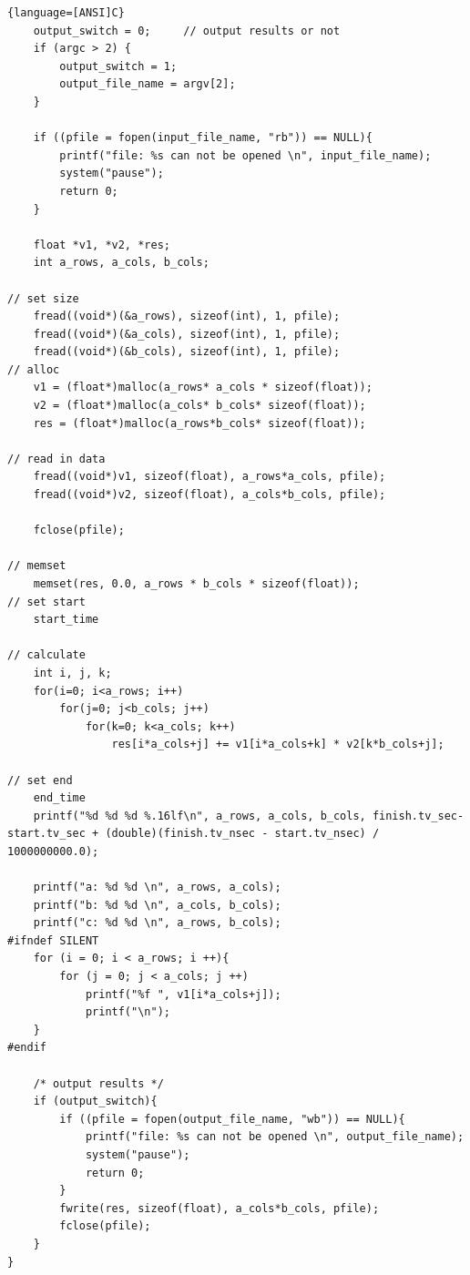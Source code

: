 \documentclass[a4paper]{article}   %
\begin{document}
\begin{CJK}{UTF8}{gbsn}
\begin{spacing}{1.2}
\begin{lstlisting}{language=[ANSI]C}
    output_switch = 0;     // output results or not 
    if (argc > 2) {       
        output_switch = 1;
        output_file_name = argv[2];
    }

    if ((pfile = fopen(input_file_name, "rb")) == NULL){
        printf("file: %s can not be opened \n", input_file_name);
        system("pause");
        return 0;
    }

    float *v1, *v2, *res;
    int a_rows, a_cols, b_cols;

// set size
    fread((void*)(&a_rows), sizeof(int), 1, pfile);
    fread((void*)(&a_cols), sizeof(int), 1, pfile);
    fread((void*)(&b_cols), sizeof(int), 1, pfile);
// alloc
    v1 = (float*)malloc(a_rows* a_cols * sizeof(float));
    v2 = (float*)malloc(a_cols* b_cols* sizeof(float));
    res = (float*)malloc(a_rows*b_cols* sizeof(float));

// read in data
    fread((void*)v1, sizeof(float), a_rows*a_cols, pfile);
    fread((void*)v2, sizeof(float), a_cols*b_cols, pfile);

    fclose(pfile);
    
// memset
    memset(res, 0.0, a_rows * b_cols * sizeof(float));
// set start
    start_time

// calculate
    int i, j, k;
    for(i=0; i<a_rows; i++)
        for(j=0; j<b_cols; j++)
            for(k=0; k<a_cols; k++)
                res[i*a_cols+j] += v1[i*a_cols+k] * v2[k*b_cols+j];

// set end
    end_time
    printf("%d %d %d %.16lf\n", a_rows, a_cols, b_cols, finish.tv_sec-start.tv_sec + (double)(finish.tv_nsec - start.tv_nsec) / 1000000000.0);
   
    printf("a: %d %d \n", a_rows, a_cols);
    printf("b: %d %d \n", a_cols, b_cols);
    printf("c: %d %d \n", a_rows, b_cols);
#ifndef SILENT    
    for (i = 0; i < a_rows; i ++){
        for (j = 0; j < a_cols; j ++) 
            printf("%f ", v1[i*a_cols+j]);
            printf("\n");
    }
#endif 

    /* output results */ 
    if (output_switch){
        if ((pfile = fopen(output_file_name, "wb")) == NULL){
            printf("file: %s can not be opened \n", output_file_name);
            system("pause");
            return 0;
        }
        fwrite(res, sizeof(float), a_cols*b_cols, pfile);
        fclose(pfile);
    }
}
\end{lstlisting}


\end{spacing}
\end{CJK}
\end{document}
